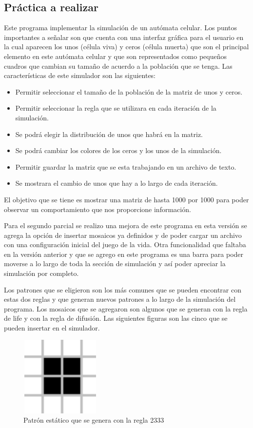 \subsection{Práctica a realizar}
Este programa implementar la simulación de un autómata celular. Los puntos importantes a señalar son que cuenta con una interfaz gráfica para el usuario en la cual aparecen los unos (célula viva) y ceros (célula muerta) que son el principal elemento en este autómata celular y que son representados como pequeños cuadros que cambian su tamaño de acuerdo a la población que se tenga. Las características de este simulador son las siguientes:
\begin{itemize}
 \item Permitir seleccionar el tamaño de la población de la matriz de unos y ceros.
 \item Permitir seleccionar la regla que se utilizara en cada iteración de la simulación.
 \item Se podrá elegir la distribución de unos que habrá en la matriz.
 \item Se podrá cambiar los colores de los ceros y los unos de la simulación.
 \item Permitir guardar la matriz que se esta trabajando en un archivo de texto.
 \item Se mostrara el cambio de unos que hay a lo largo de cada iteración.
\end{itemize}
El objetivo que se tiene es mostrar una matriz de hasta 1000 por 1000 para poder observar un comportamiento que nos proporcione información.

Para el segundo parcial se realizo una mejora de este programa en esta versión se agrega la opción de insertar mosaicos ya definidos y de poder cargar un archivo con una configuración inicial del juego de la vida. Otra funcionalidad que faltaba en la versión anterior y que se agrego en este programa es una barra para poder moverse a lo largo de toda la sección de simulación y así poder apreciar la simulación por completo.

Los patrones que se eligieron son los más comunes que se pueden encontrar con estas dos reglas y que generan nuevos patrones a lo largo de la simulación del programa. Los mosaicos que se agregaron son algunos que se generan con la regla de life y con la regla de difusión. Las siguientes figuras son las cinco que se pueden insertar en el simulador.

\begin{figure}[H]
\begin{center}
 \includegraphics[width=4cm, height=4cm]{./img/cuadrado.png}
 \caption{Patrón estático que se genera con la regla 2333}
 \label{fig:cuadrado}
\end{center}
\end{figure}

